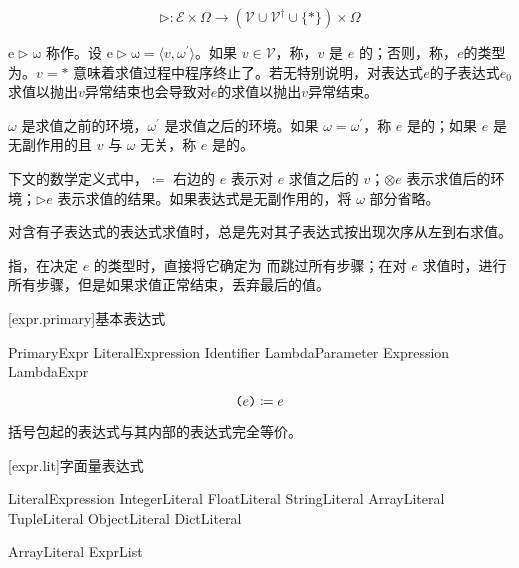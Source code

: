 $$ \mathrm{\rhd}: \mathcal{E} \times \Omega \rightarrow (\mathcal{V} \cup \mathcal{V}^\dag \cup \{\ast\}) \times \Omega $$

\pnum
$\mathrm{e \rhd \omega}$ 称作。设 $\mathrm{e \rhd \omega} = \langle v, \omega^\prime \rangle$。如果 $v \in \mathcal{V}$，称，$v$ 是 $e$ 的；否则，称，$e$的类型为。$v = \ast$ 意味着求值过程中程序终止了。若无特别说明，对表达式$e$的子表达式$e_0$求值以抛出$v$异常结束也会导致对$e$的求值以抛出$v$异常结束。

\pnum
$\omega$ 是求值之前的环境，$\omega^\prime$ 是求值之后的环境。如果 $\omega = \omega^\prime$，称 $e$ 是的；如果 $e$ 是无副作用的且 $v$ 与 $\omega$ 无关，称 $e$ 是的。

\pnum
下文的数学定义式中，$\coloneqq$ 右边的 $e$ 表示对 $e$ 求值之后的 $v$；$\otimes e$ 表示求值后的环境；$\rhd e$ 表示求值的结果。如果表达式是无副作用的，将 $\omega$ 部分省略。

\pnum
对含有子表达式的表达式求值时，总是先对其子表达式按出现次序从左到右求值。

\pnum
{}指，在决定 $e$ 的类型时，直接将它确定为  而跳过所有步骤；在对 $e$ 求值时，进行所有步骤，但是如果求值正常结束，丢弃最后的值。

[expr.primary]{基本表达式}

\begin{bnf}{PrimaryExpr}
    LiteralExpression \br
    Identifier \br
    LambdaParameter \br
    \terminal{(} Expression \terminal{)} \br
    LambdaExpr
\end{bnf}

$$ \texttt{(}e\texttt{)} \coloneqq e $$

\pnum
括号包起的表达式与其内部的表达式完全等价。

[expr.lit]{字面量表达式}

\begin{bnf}{LiteralExpression}
    IntegerLiteral \br
    FloatLiteral \br
    StringLiteral \br
     \br
     \br
     \br
    \terminal{()} \br
    ArrayLiteral \br
    TupleLiteral \br
    ObjectLiteral \br
    DictLiteral
\end{bnf}

\begin{bnf}{ArrayLiteral}
    \terminal{[} ExprList\bnfq \terminal{]}
\end{bnf}

